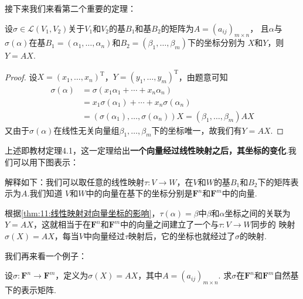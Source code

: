 接下来我们来看第二个重要的定理：
\begin{theorem}[线性映射对向量坐标的影响] \label{thm:11:线性映射对向量坐标的影响}
    设$\sigma \in \mathcal{L}(V_1,V_2)$关于$V_1$和$V_2$的基$B_1$和基$B_2$的矩阵为$A=(a_{ij})_{m \times n}$，
    且$\alpha$与$\sigma(\alpha)$在基$B_1=(\alpha_1,\ldots,\alpha_n)$和$B_2=(\beta_1,\ldots,\beta_m)$下的坐标分别为
    $X$和$Y$，则$Y=AX$.
\end{theorem}
\begin{proof}
    设$X=(x_1,\ldots,x_n)^\mathrm{T}$，$Y=(y_1,\ldots,y_m)^\mathrm{T}$，由题意可知
    \begin{align*}
        \sigma(\alpha)&=\sigma(x_1\alpha_1+\cdots+x_n\alpha_n) \\
        &=x_1\sigma(\alpha_1)+\cdots+x_n\sigma(\alpha_n) \\
        &=(\sigma(\alpha_1),\ldots,\sigma(\alpha_n))X=(\beta_1,\ldots,\beta_m)AX
    \end{align*}
    又由于$\sigma(\alpha)$在线性无关向量组$\beta_1,\ldots,\beta_m$下的坐标唯一，故我们有$Y=AX$.
\end{proof}

上述即教材定理4.1，这一定理给出\textbf{一个向量经过线性映射之后，其坐标的变化}.我们可以用下图表示：
\begin{figure}[htbp]
    \centering
\end{figure}

解释如下：我们可以取任意的线性映射$\tau:V\to W$，在$V$和$W$的基$B_1$和$B_2$下的矩阵表示为$A$.我们知道
$V$和$W$中的向量在基下的坐标分别是$\mathbf{F}^n$和$\mathbf{F}^m$中的向量.

根据\autoref{thm:11:线性映射对向量坐标的影响}，$\tau(\alpha)=\beta$中$\beta$和$\alpha$坐标之间的关联为
$Y=AX$，这就相当于在$\mathbf{F}^n$和$\mathbf{F}^m$中的向量之间建立了一个与$\tau:V\to W$同步的
映射$\sigma(X)=AX$，每当$V$中向量经过$\tau$映射后，它的坐标也就经过了$\sigma$的映射.

我们再来看一个例子：
\begin{example}
    设$\sigma:\mathbf{F}^n\to\mathbf{F}^m$，定义为$\sigma(X)=AX$，其中$A=(a_{ij})_{m\times n}$.
    求$\sigma$在$\mathbf{F}^n$和$\mathbf{F}^m$自然基下的表示矩阵.
\end{example}
\begin{solution}

\end{solution}

